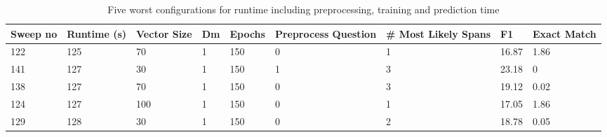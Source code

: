 \documentclass[11pt]{article}
\begin{document}
    \begin{table}[p]
        \centering
        \begin{tabularx}{\textwidth}{|X|X|X|X|X|X|X|X|X|}
            \hline
            Sweep no & Runtime (s) & Vector Size & Dm & Epochs & Preprocess Question & \# Most Likely Spans & F1 & Exact Match \\ \hline
            122      & 125         & 70          & 1  & 150    & 0                   & 1                    & 16.87 & 1.86        \\ \hline
            141      & 127         & 30          & 1  & 150    & 1                   & 3                    & 23.18 & 0           \\ \hline
            138      & 127         & 70          & 1  & 150    & 0                   & 3                    & 19.12 & 0.02        \\ \hline
            124      & 127         & 100         & 1  & 150    & 0                   & 1                    & 17.05 & 1.86        \\ \hline
            129      & 128         & 30          & 1  & 150    & 0                   & 2                    & 18.78 & 0.05        \\ \hline
        \end{tabularx}
        \caption{Five worst configurations for runtime including preprocessing, training and prediction time}
        \label{table:5-worst-runtime}
    \end{table}
\end{document}
